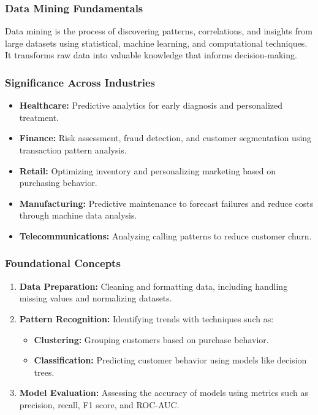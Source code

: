 \documentclass[aspectratio=169]{beamer}
\begin{document}
\begin{frame}[fragile]
    \frametitle{Data Mining Fundamentals}
    Data mining is the process of discovering patterns, correlations, and insights from large datasets using statistical, machine learning, and computational techniques. It transforms raw data into valuable knowledge that informs decision-making.
\end{frame}

\begin{frame}[fragile]
    \frametitle{Significance Across Industries}
    \begin{itemize}
        \item \textbf{Healthcare:} Predictive analytics for early diagnosis and personalized treatment.
        \item \textbf{Finance:} Risk assessment, fraud detection, and customer segmentation using transaction pattern analysis.
        \item \textbf{Retail:} Optimizing inventory and personalizing marketing based on purchasing behavior.
        \item \textbf{Manufacturing:} Predictive maintenance to forecast failures and reduce costs through machine data analysis.
        \item \textbf{Telecommunications:} Analyzing calling patterns to reduce customer churn.
    \end{itemize}
\end{frame}

\begin{frame}[fragile]
    \frametitle{Foundational Concepts}
    \begin{enumerate}
        \item \textbf{Data Preparation:} Cleaning and formatting data, including handling missing values and normalizing datasets.
        \item \textbf{Pattern Recognition:} Identifying trends with techniques such as:
        \begin{itemize}
            \item \textbf{Clustering:} Grouping customers based on purchase behavior.
            \item \textbf{Classification:} Predicting customer behavior using models like decision trees.
        \end{itemize}
        \item \textbf{Model Evaluation:} Assessing the accuracy of models using metrics such as precision, recall, F1 score, and ROC-AUC.
    \end{enumerate}
\end{frame}
\end{document}
